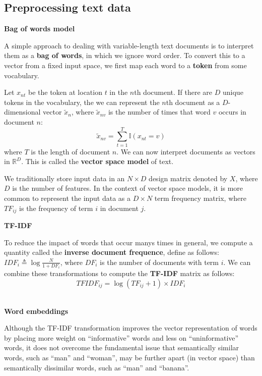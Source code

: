 \subsection{Preprocessing text data}
\noindent
\textbf{Bag of words model}
\par
A simple approach to dealing with variable-length text documents is to interpret them as a \textbf{bag of words}, in which we ignore word order. To convert this to a vector from a fixed input space, we first map each word to a \textbf{token} from some vocabulary.
\par
Let $x_{nt}$ be the token at location $t$ in the $n$th document. If there are $D$ unique tokens in the vocabulary, the we can represent the $n$th document as a $D$-dimensional vector $\widetilde{x}_n$, where $\widetilde{x}_{nv}$ is the number of times that word $v$ occurs in document $n$:
\begin{equation}
\widetilde{x}_{nv} = \sum_{t=1}^T\mathbb{I}(x_{nt} = v)
\end{equation}
where $T$ is the length of document $n$. We can now interpret documents as vectors in $\mathbb{R}^D$. This is called the \textbf{vector space model} of text.
\par
We traditionally store input data in an $N\times D$ design matrix denoted by $X$, where $D$ is the number of features. In the context of vector space models, it is more common to represent the input data as a $D \times N$ term frequency matrix, where $TF_{ij}$ is the frequency of term $i$ in document $j$. 
~\\
\par
\noindent
\textbf{TF-IDF}
\par
To reduce the impact of words that occur manys times in general, we compute a quantity called the \textbf{inverse document frequence}, define as follows: $IDF_i \triangleq \log\frac{N}{1+DF_i}$, where $DF_i$ is the number of documents with term $i$. We can combine these transformations to compute the \textbf{TF-IDF} matrix as follows:
\begin{equation}
TFIDF_{ij} = \log(TF_{ij}+1)\times IDF_{i}
\end{equation}
~\\
\par
\noindent
\textbf{Word embeddings}
\par
Although the TF-IDF transformation improves the vector representation of words by placing more weight on “informative” words and less on “uninformative” words, it does not overcome the fundamental issue that semantically similar words, such as “man” and “woman”, may be further apart (in vector space) than semantically dissimilar words, such as “man” and “banana”. 
